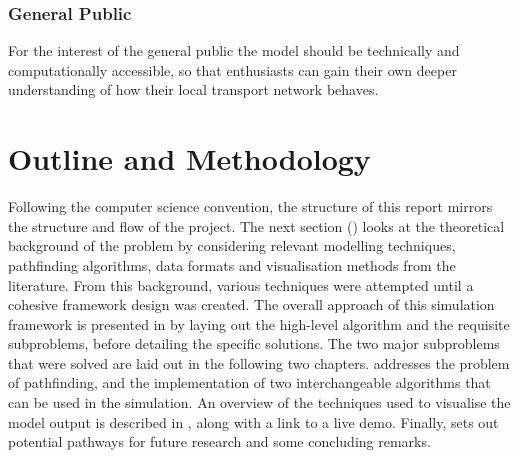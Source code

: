 \subsubsection{General Public}
For the interest of the general public the model should be technically and computationally accessible, so that enthusiasts can gain their own deeper understanding of how their local transport network behaves.

\section{Outline and Methodology}
Following the computer science convention, the structure of this report mirrors the structure and flow of the project. The next section () looks at the theoretical background of the problem by considering relevant modelling techniques, pathfinding algorithms, data formats and visualisation methods from the literature. From this background, various techniques were attempted until a cohesive framework design was created. The overall approach of this simulation framework is presented in  by laying out the high-level algorithm and the requisite subproblems, before detailing the specific solutions. The two major subproblems that were solved are laid out in the following two chapters.  addresses the problem of pathfinding, and the implementation of two interchangeable algorithms that can be used in the simulation. An overview of the techniques used to visualise the model output is described in , along with a link to a live demo. Finally,  sets out potential pathways for future research and some concluding remarks.
